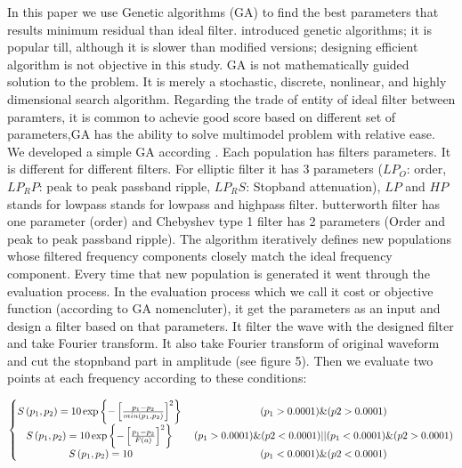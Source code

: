 \documentclass{article}
\begin{document}
In this paper we use  Genetic algorithms  (GA) to find the best parameters that results minimum residual than ideal filter. \citet{Holland_1973} introduced genetic algorithms; it is popular till, although it is slower than modified versions; designing efficient algorithm is not objective in this study. GA is not mathematically guided solution to the problem. It is merely a stochastic, discrete, nonlinear, and highly dimensional search algorithm.
Regarding the trade of entity of ideal filter between paramters, it is common to achevie good score based on different set of parameters,GA has the ability to solve multimodel problem with relative ease. We developed a simple GA  according \citet{Man_1996}. Each population has filters parameters. It is different for different filters. For elliptic filter it has 3 parameters ($LP_O$: order, $LP_RP$: peak to peak passband ripple, $LP_RS$: Stopband attenuation), $LP$ and $HP$ stands for lowpass stands for lowpass and highpass filter. butterworth filter has one parameter (order) and Chebyshev type 1 filter has 2 parameters (Order and peak to peak passband ripple).   The algorithm iteratively defines new populations whose filtered frequency components closely match the ideal frequency component. Every time that new population is generated it went through the evaluation process. In the evaluation process which we call it cost or objective function (according to GA nomencluter), it get the parameters as an input and design a filter based on that parameters. It filter the wave with the designed filter and take Fourier transform. It also take Fourier transform of original waveform and cut the stopnband part in amplitude (see figure 5). Then we evaluate two points at each frequency according to these conditions:


\begin{equation}
\left\{\begin{matrix}

S \left( p_1,p_2 \right) = 10 \exp \left\{ -\left[ \frac{p_1-p_2}{min \left(p_1,p_2\right)} \right]^2 \right\}  \hspace{0.25em}  &  (p_1 > 0.0001) \& (p2 > 0.0001) \\   

 S \left( p_1,p_2 \right) = 10 \exp \left\{ -\left[ \frac{p_1 - p_2}{F(a)} \right]^2 \right\} \hspace{0.25em} &  (p_1 > 0.0001) \& (p2 < 0.0001) || (p_1 < 0.0001) \& (p2 > 0.0001)\\

S \left( p_1,p_2 \right) = 10  &  (p_1 < 0.0001) \& (p2 < 0.0001) \\
   
\end{matrix}\right.
\end{equation}
\end{document}
